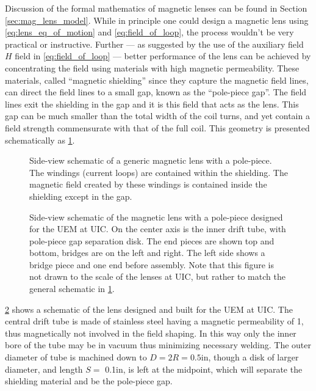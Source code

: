 Discussion of the formal mathematics of magnetic lenses can be found in Section \ref{sec:mag_lens_model}.
While in principle one could design a magnetic lens using \ref{eq:lens_eq_of_motion} and \ref{eq:field_of_loop}, the process wouldn't be very practical or instructive.
Further --- as suggested by the use of the auxiliary field $H$ field in \ref{eq:field_of_loop} --- better performance of the lens can be achieved by concentrating the field using materials with high magnetic permeability.
These materials, called ``magnetic shielding'' since they capture the magnetic field lines, can direct the field lines to a small gap, known as the ``pole-piece gap''.
The field lines exit the shielding in the gap and it is this field that acts as the lens.
This gap can be much smaller than the total width of the coil turns, and yet contain a field strength commensurate with that of the full coil.
This geometry is presented schematically as \ref{fig:polepiece-schematic}.

\begin{figure}
  \centering
  
  \caption[Schematic of a generic magnetic lens with a pole-piece]{
    Side-view schematic of a generic magnetic lens with a pole-piece.
    The windings (current loops) are contained within the shielding.
    The magnetic field created by these windings is contained inside the shielding except in the gap.
  }
  \label{fig:polepiece-schematic}
\end{figure}

\begin{figure}
  \centering
  
  \caption[Design schematic of our magnetic lens with a pole-piece]{
    Side-view schematic of the magnetic lens with a pole-piece designed for the UEM at UIC.
    On the center axis is the inner drift tube, with pole-piece gap separation disk.
    The end pieces are shown top and bottom, bridges are on the left and right.
    The left side shows a bridge piece and one end before assembly.
    Note that this figure is not drawn to the scale of the lenses at UIC, but rather to match the general schematic in \ref{fig:polepiece-schematic}.
  }
  \label{fig:polepiece-design}
\end{figure}

\ref{fig:polepiece-design} shows a schematic of the lens designed and built for the UEM at UIC.
The central drift tube is made of stainless steel having a magnetic permeability of 1, thus magnetically not involved in the field shaping.
In this way only the inner bore of the tube may be in vacuum thus minimizing necessary welding.
The outer diameter of tube is machined down to $ D = 2R = 0.5 \text{in}$, though a disk of larger diameter, and length $ S = $ 0.1in, is left at the midpoint, which will separate the shielding material and be the pole-piece gap.

